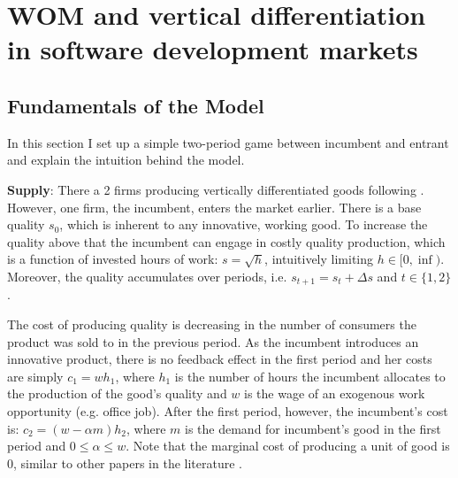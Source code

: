 \documentclass{article}
\numberwithin{figure}{section}
\numberwithin{table}{section}
\theoremstyle{indented}
\numberwithin{equation}{section} %
\begin{document}

\setcounter{tocdepth}{2}
\addtocounter{page}{-1}


\section{WOM and vertical differentiation in software development markets}


\subsection{Fundamentals of the Model} \label{model}
 
 In this section I set up a simple two-period game between incumbent and entrant and explain the intuition behind the model.

\textbf{Supply}:
There a 2 firms producing vertically differentiated goods following  \citet{Tirole}. However, one firm, the incumbent, enters the market earlier. There is a base quality $s_0$, which is inherent to any innovative, working good. To increase the quality above that the incumbent can engage in costly quality production, which is a function of invested hours of work: $s=\sqrt{h}$, intuitively limiting $h \in [0,\inf)$. Moreover, the quality accumulates over periods, i.e. $s_{t+1}=s_{t}+\Delta s$ and $t \in \{1,2\}$. 

The cost of producing quality is decreasing in the number of consumers the product was sold to in the previous period. As the incumbent introduces an innovative product, there is no feedback effect in the first period and her costs are simply $c_1= wh_1$, where $h_1$ is the number of hours the incumbent allocates to the production of the good's quality and $w$ is the wage of an exogenous work opportunity (e.g. office job). After the first period, however, the incumbent's cost is: $c_2= (w-\alpha m)h_2$, where $m$ is the demand for incumbent's good in the first period and $0\leq \alpha \leq w$. Note that the marginal cost of producing a unit of good is 0, similar to other papers in the literature \citep{Ajorlou2018}. 
\end{document}
